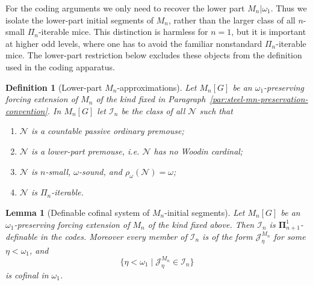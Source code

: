 \documentclass[a4paper,11pt]{article}
\newtheorem{lemma}[theorem]{Lemma}
\newtheorem{definition}[theorem]{Definition}
\begin{document}
For the coding arguments we only need to recover the lower part $M_n|\omega_1$.  Thus we isolate the lower-part initial segments of $M_n$, rather than the larger class of all $n$-small $\Pi_n$-iterable mice.  This distinction is harmless for $n=1$, but it is important at higher odd levels, where one has to avoid the familiar nonstandard $\Pi_n$-iterable mice.  The lower-part restriction below excludes these objects from the definition used in the coding apparatus.

\begin{definition}[Lower-part $M_n$-approximations]\label{def:mn-lower-part-approximations}
Let $M_n[G]$ be an $\omega_1$-preserving forcing extension of $M_n$ of the kind fixed in Paragraph~\ref{par:steel-mn-preservation-convention}.  In $M_n[G]$ let $\mathcal I_n$ be the class of all $\mathcal N$ such that
\begin{enumerate}
   \item $\mathcal N$ is a countable passive ordinary premouse;
   \item $\mathcal N$ is a lower-part premouse, i.e. $\mathcal N$ has no Woodin cardinal;
   \item $\mathcal N$ is $n$-small, $\omega$-sound, and $\rho_\omega(\mathcal N)=\omega$;
   \item $\mathcal N$ is $\Pi_n$-iterable.
\end{enumerate}
\end{definition}

\begin{lemma}[Definable cofinal system of $M_n$-initial segments]\label{lem:definable-mn-initial-segments}
Let $M_n[G]$ be an $\omega_1$-preserving forcing extension of $M_n$ of the kind fixed above.  Then $\mathcal I_n$ is $\boldsymbol\Pi^1_{n+1}$-definable in the codes.  Moreover every member of $\mathcal I_n$ is of the form $\mathcal J^{M_n}_\eta$ for some $\eta<\omega_1$, and
\[
   \{\eta<\omega_1\mid \mathcal J^{M_n}_\eta\in\mathcal I_n\}
\]
is cofinal in $\omega_1$.
\end{lemma}
\end{document}
